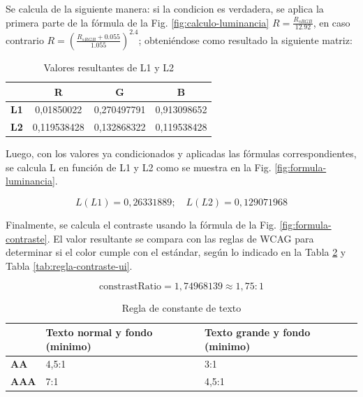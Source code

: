 \documentclass[lettersize,journal]{IEEEtran}
\begin{document}
\begin{itemize}
				
		\noindent Se calcula de la siguiente manera: si la condicion es verdadera, se aplica la primera parte de la fórmula de la Fig. \ref{fig:calculo-luminancia} $R = \frac{R_{sRGB}}{12.92}$, en caso contrario $R = \left( \frac{R_{sRGB} + 0.055}{1.055} \right)^{2.4}$;  obteniéndose como resultado la siguiente matriz:
		
		\begin{table}[H]
			\centering
			\caption{Valores resultantes de L1 y L2}
			\label{tab:valores-resultantes-L1-L2}
			\begin{tabular}{|c|c|c|c|}
				\hline
				& \textbf{R} & \textbf{G} & \textbf{B} \\
				\hline
				\textbf{L1} & 0,01850022 & 0,270497791 & 0,913098652 \\
				\hline
				\textbf{L2} & 0,119538428 & 0,132868322 & 0,119538428 \\
				\hline
			\end{tabular}
			\vspace{0.2cm}
		\end{table}
		
		\noindent Luego, con los valores ya condicionados y aplicadas las fórmulas correspondientes, se calcula L en función de L1 y L2 como se muestra en la Fig. \ref{fig:formula-luminancia}. 
		
		\begin{equation}
			L(L1) = 0,26331889 ; \quad L(L2) = 0,129071968
		\end{equation}
	
		\noindent Finalmente, se calcula el contraste usando la fórmula de la Fig. \ref{fig:formula-contraste}. El valor resultante se compara con las reglas de WCAG para determinar si el color cumple con el estándar, según lo indicado en la Tabla \ref{tab:regla-constante-texto} y Tabla \ref{tab:regla-contraste-ui}.
		
		\[ \text{constrastRatio} = 1,74968139 \approx 1,75:1 \]
		
		\begin{table}[ht]
			\centering
			\caption{Regla de constante de texto}
			\label{tab:regla-constante-texto}
			\begin{tabular}{|p{2cm}|p{2cm}|p{2cm}|}
				\hline
				& \textbf{Texto normal y fondo (minimo)} & \textbf{Texto grande y fondo (minimo)} \\
				\hline
				\textbf{AA} & 4,5:1 & 3:1 \\
				\hline
				\textbf{AAA} & 7:1 & 4,5:1 \\
				\hline
			\end{tabular}
		\end{table}
		

\end{itemize}
\end{document}

